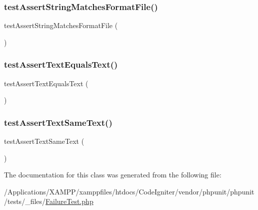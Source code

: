 \mbox{\label{class_failure_test_a173a96eab8a73d1e09abb15bc38301e9}} 
\subsubsection{\texorpdfstring{test\+Assert\+String\+Matches\+Format\+File()}{testAssertStringMatchesFormatFile()}}
{\footnotesize\ttfamily test\+Assert\+String\+Matches\+Format\+File (\begin{DoxyParamCaption}{ }\end{DoxyParamCaption})}

\mbox{\label{class_failure_test_acc0b1f433e6bb896b822a9495e9c8651}} 
\subsubsection{\texorpdfstring{test\+Assert\+Text\+Equals\+Text()}{testAssertTextEqualsText()}}
{\footnotesize\ttfamily test\+Assert\+Text\+Equals\+Text (\begin{DoxyParamCaption}{ }\end{DoxyParamCaption})}

\mbox{\label{class_failure_test_ac057c8d7a9ead4af51487fe3c34b40f2}} 
\subsubsection{\texorpdfstring{test\+Assert\+Text\+Same\+Text()}{testAssertTextSameText()}}
{\footnotesize\ttfamily test\+Assert\+Text\+Same\+Text (\begin{DoxyParamCaption}{ }\end{DoxyParamCaption})}



The documentation for this class was generated from the following file\+:\begin{DoxyCompactItemize}
\item 
/\+Applications/\+X\+A\+M\+P\+P/xamppfiles/htdocs/\+Code\+Igniter/vendor/phpunit/phpunit/tests/\+\_\+files/\mbox{\hyperlink{_failure_test_8php}{Failure\+Test.\+php}}\end{DoxyCompactItemize}
